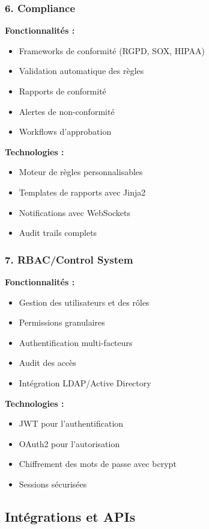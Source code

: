 \documentclass[12pt,a4paper]{article}
\begin{document}
\subsubsection{6. Compliance}
\textbf{Fonctionnalités :}
\begin{itemize}
    \item Frameworks de conformité (RGPD, SOX, HIPAA)
    \item Validation automatique des règles
    \item Rapports de conformité
    \item Alertes de non-conformité
    \item Workflows d'approbation
\end{itemize}

\textbf{Technologies :}
\begin{itemize}
    \item Moteur de règles personnalisables
    \item Templates de rapports avec Jinja2
    \item Notifications avec WebSockets
    \item Audit trails complets
\end{itemize}

\subsubsection{7. RBAC/Control System}
\textbf{Fonctionnalités :}
\begin{itemize}
    \item Gestion des utilisateurs et des rôles
    \item Permissions granulaires
    \item Authentification multi-facteurs
    \item Audit des accès
    \item Intégration LDAP/Active Directory
\end{itemize}

\textbf{Technologies :}
\begin{itemize}
    \item JWT pour l'authentification
    \item OAuth2 pour l'autorisation
    \item Chiffrement des mots de passe avec bcrypt
    \item Sessions sécurisées
\end{itemize}

\subsection{Intégrations et APIs}
\end{document}
